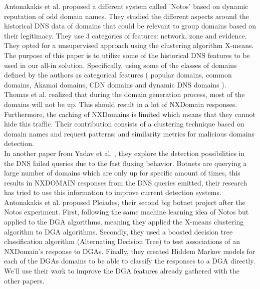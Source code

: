 Antonakakis et al. \cite{dnsreputation} proposed a different system called 'Notos' based on dynamic reputation of odd domain names. They studied the different aspects around the historical DNS data of domains that could be relevant to group domains based on their legitimacy. They use 3 categories of features: network, zone and evidence. They opted for a unsupervised approach using the clustering algorithm X-means. The purpose of this paper is to utilize some of the historical DNS features to be used in our all-in solution. Specifically, using some of the classes of domains defined by the authors as categorical features ( popular domains, common domains, Akamai domains,  CDN domains and dynamic DNS domains ).\\

Thomas et al. \cite{dga4} realized that during the domain generation process, most of the domains will not be up. This should result in a lot of NXDomain responses. Furthermore, the caching of NXDomains is limited which means that they cannot hide this traffic. Their contribution consists of a clustering technique based on domain names and request patterns; and similarity metrics for malicious domains detection.\\

In another paper from Yadav et al. \cite{dnsfailure}, they explore the detection possibilities in the DNS failed queries due to the fast fluxing behavior. Botnets are querying a large number of domains which are only up for specific amount of times, this results in NXDOMAIN responses from the DNS queries emitted, their research has tried to use this information to improve current detection systems.\\

Antonakakis et al. \cite{pleiades} proposed Pleiades, their second big botnet project after the Notos experiment. First, following the same machine learning idea of Notos but applied to the DGA algorithms, meaning they applied the X-means clustering algorithm to DGA algorithms. Secondly, they used a boosted decision tree classification algorithm (Alternating Decision Tree) to test associations of an NXDomain's response to  DGAs. Finally, they created Hiddem Markov models for each of the DGAs domains to be able to classify the responses to a DGA directly. We'll use their work to improve the DGA features already gathered with the other papers.


